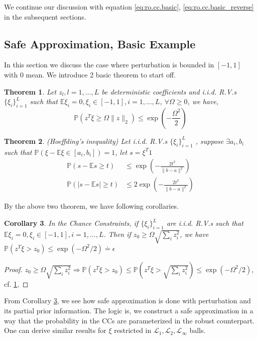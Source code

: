 \documentclass[a4pper,11pt]{article}
\newcommand{\ex}{\mathbb E}
\newcommand{\pr}{\mathbb P}
\newtheorem{thm}{Theorem}[section]
\newtheorem{cor}[thm]{Corollary}
\begin{document}
We continue our discussion with equation \eqref{eq:ro.cc.basic}, \eqref{eq:ro.cc.basic_reverse} in the subsequent sections.
\subsection{Safe Approximation, Basic Example}

In this section we discuss the case where perturbation is bounded in \([-1, 1]\) with \(0\) mean. We introduce 2 basic theorem to start off.

\begin{thm}\label{tm:ro.cc.1}
    Let \(z_l, l = 1, \dots, L\) be deterministic coefficients and i.i.d. R.V.s \(\{\xi_i\}_{i=1}^L\) such that
    \(\ex \xi_i = 0, \xi_i \in [-1, 1], i = 1, \dots, L\), \(\forall \Omega \ge 0\), we have,
    \begin{equation*}
        \pr(z^T\xi \ge \Omega \|z\|_2) \le \exp\left(-\frac{\Omega^2}{2}\right)
    \end{equation*}
\end{thm}

\begin{thm}\label{tm:ro.cc.hoef}
    \emph{(Hoeffding's inequality)} Let i.i.d. R.V.s \(\{\xi_i\}_{i=1}^L\) , suppose \(\exists a_i, b_i\) such that \(\pr (\xi - \ex\xi \in [a_i, b_i]) = 1\), let \(s = \xi^T 1\)
    \begin{align*}
        \pr(s - \ex s \ge t)   & \le \exp\left(-\frac{2t^2}{\|b-a\|^2}\right)  \\
        \pr(|s - \ex s| \ge t) & \le 2\exp\left(-\frac{2t^2}{\|b-a\|^2}\right)
    \end{align*}
\end{thm}


By the above two theorem, we have following corollaries.

\begin{cor} \label{coro:ro.cc.tm1}
    In the Chance Constraints, if \(\{\xi_i\}_{i=1}^L\) are i.i.d. R.V.s such that
    \(\ex \xi_i = 0, \xi_i \in [-1, 1], i = 1, \dots, L\). Then if \(z_0 \ge \Omega\sqrt{\sum_iz_i^2}\), we have \(\pr(z^T\xi > z_0) \le \exp(-\Omega^2/2)\doteq \epsilon\)
\end{cor}
\begin{proof}
    \(z_0 \ge \Omega\sqrt{\sum_iz_i^2} \Rightarrow \pr(z^T\xi > z_0) \le \pr(z^T\xi > \sqrt{\sum_iz_i^2}) \le \exp(-\Omega^2/2)\), cf. \ref{tm:ro.cc.1},
\end{proof}

From Corollary \ref{coro:ro.cc.tm1}, we see how safe approximation is done with perturbation and its partial prior information. The logic is, we construct a safe approximation in a way that the probability in the CCs are parameterized in the robust counterpart. One can derive similar results for \(\xi\) restricted in \(\mathscr L_1, \mathscr L_2, \mathscr L_\infty\) balls.
\end{document}
